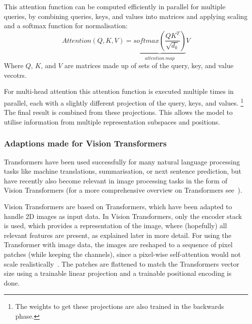 This attention function can be computed efficiently in parallel for multiple queries, by combining queries, keys, and values into matrices and applying scaling and a softmax function for normalisation:~\autocite{Vaswani2017}
\begin{equation}
    Attention(Q,K,V)=\underbrace{softmax\left(\frac{Q K^T}{\sqrt{d_k}}\right)}_{attention~map} V
    \label{eq:KQV}
\end{equation}
Where $Q$, $K$, and $V$ are matrices made up of sets of the query, key, and value vecotrs.

For multi-head attention this attention function is executed multiple times in parallel, each with a slightly different projection of the query, keys, and values.
\footnote{The weights to get these projections are also trained in the backwards phase.}
The final result is combined from these projections.
This allows the model to utilise information from multiple representation subspaces and positions.~\autocite{Vaswani2017}


\subsubsection{Adaptions made for Vision Transformers}\label{subsubsec:visiontransformer}
Transformers have been used successfully for many natural language processing tasks like machine translations, summarisation, or next sentence prediction, but have recently also become relevant in image processing tasks in the form of Vision Transformers (for a more comprehensive overview on Transformers see~\autocite{Lin2021}).

Vision Transformers are based on Transformers, which have been adapted to handle 2D images as input data.
In Vision Transformers, only the encoder stack is used, which provides a representation of the image, where (hopefully) all relevant features are present, as explained later in more detail.
For using the Transformer with image data, the images are reshaped to a sequence of pixel patches (while keeping the channels), since a pixel-wise self-attention would not scale realistically~\autocite{Dosovitskiy2021}.
The patches are flattened to match the Transformers vector size using a trainable linear projection and a trainable positional encoding is done.

